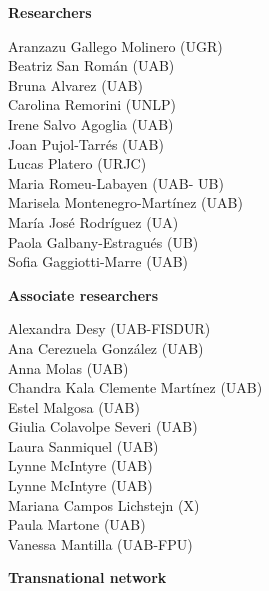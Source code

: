 \documentclass[english,a4paper,12pt,titlepage]{report}
\begin{document}
	\begin{multicols}{2}
	
	\textbf{Researchers}
	
 Aranzazu Gallego Molinero (UGR) \\
 Beatriz San Román (UAB) \\
 Bruna Alvarez (UAB) \\
 Carolina Remorini (UNLP)\\
 Irene Salvo Agoglia (UAB)\\
 Joan Pujol-Tarrés (UAB) \\
 Lucas Platero (URJC) \\
 Maria Romeu-Labayen (UAB- UB) \\
 Marisela Montenegro-Martínez (UAB) \\
 María José Rodríguez (UA) \\
 Paola Galbany-Estragués (UB) \\
 Sofia Gaggiotti-Marre (UAB)\\

 \vspace{0.5cm}

	\textbf{Associate researchers}
	
Alexandra Desy (UAB-FISDUR) \\
Ana Cerezuela González (UAB)\\
Anna Molas (UAB)\\
Chandra Kala Clemente Martínez (UAB)\\
Estel Malgosa (UAB) \\
Giulia Colavolpe Severi (UAB)\\
Laura Sanmiquel (UAB) \\
Lynne McIntyre (UAB)\\
Lynne McIntyre (UAB) \\
Mariana Campos Lichstejn (X)\\
Paula Martone (UAB)\\
Vanessa Mantilla (UAB-FPU)\\

\vspace{0.5cm}

	\textbf{Transnational network}
	


\end{multicols}
\end{document}
